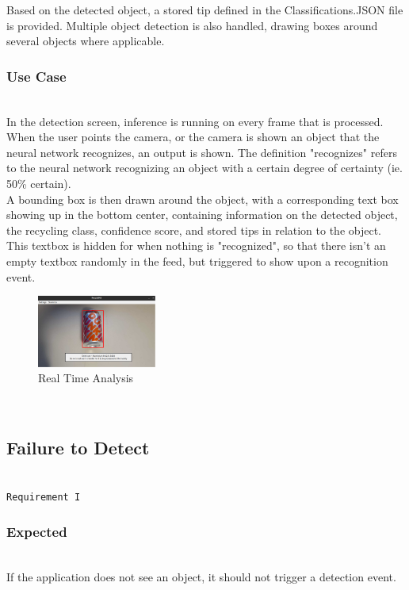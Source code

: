 \documentclass[conference]{IEEEtran}
\begin{document}
Based on the detected object, a stored tip defined in the Classifications.JSON file is provided. Multiple object detection is also handled, drawing boxes around several objects where applicable. \\

\subsubsection{Use Case}~\\
In the detection screen, inference is running on every frame that is processed. When the user points the camera, or the camera is shown an object that the neural network recognizes, an output is shown. The definition "recognizes" refers to the neural network recognizing an object with a certain degree of certainty (ie. 50\% certain). \\

A bounding box is then drawn around the object, with a corresponding text box showing up in the bottom center, containing information on the detected object, the recycling class, confidence score, and stored tips in relation to the object. This textbox is hidden for when nothing is "recognized", so that there isn't an empty textbox randomly in the feed, but triggered to show upon a recognition event.~\\
 
\begin{figure}[!h]
    \centering
    \includegraphics[width=0.35\textwidth]{images/successful_detection.eps}
    \caption{Real Time Analysis}
\end{figure}~\\

\subsection{Failure to Detect}~\\
\texttt{Requirement I}~\\
\subsubsection{Expected}~\\
If the application does not see an object, it should not trigger a detection event.~\\
\end{document}
